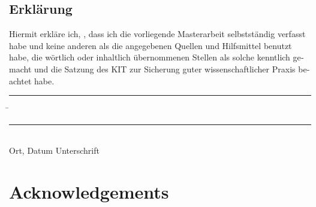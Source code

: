 \documentclass[parskip=no,12pt,a4paper,twoside,headings=openright, fleqn]{scrreprt}
\begin{document}



\begin{otherlanguage}{ngerman}
\chapter*{Erklärung}
\pagestyle{empty}

  \vspace{20mm}
  Hiermit erkläre ich, \theauthor, dass ich die vorliegende Masterarbeit selbst\-ständig
verfasst habe und keine anderen als die angegebenen Quellen und Hilfsmittel
benutzt habe, die wörtlich oder inhaltlich übernommenen Stellen als solche kenntlich gemacht und
die Satzung des KIT zur Sicherung guter wissenschaftlicher Praxis beachtet habe.
  \vspace{20mm}
  \begin{tabbing}
  \rule{7cm}{.4pt}\hspace{1cm} \= \rule{6.8cm}{.4pt} \\
 Ort, Datum \> Unterschrift
  \end{tabbing}
\end{otherlanguage}

\chapter*{Acknowledgements}
\thispagestyle{balloon}
\pagestyle{empty}
\end{document}
